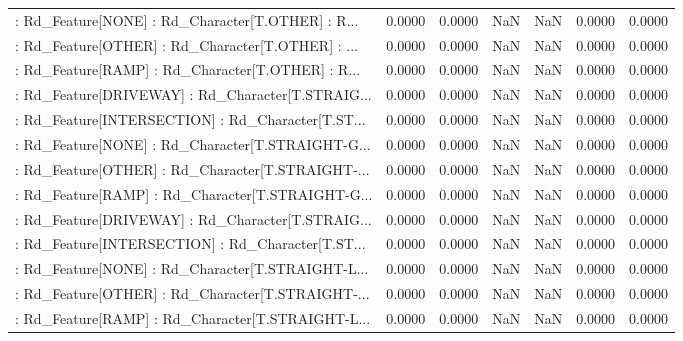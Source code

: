 \begin{longtable}{p{4cm}cccccc}
 : Rd\_Feature[NONE] : Rd\_Character[T.OTHER] : R... &            0.0000 &            0.0000 &     NaN &          NaN &             0.0000 &            0.0000 \\
 : Rd\_Feature[OTHER] : Rd\_Character[T.OTHER] : ... &            0.0000 &            0.0000 &     NaN &          NaN &             0.0000 &            0.0000 \\
 : Rd\_Feature[RAMP] : Rd\_Character[T.OTHER] : R... &            0.0000 &            0.0000 &     NaN &          NaN &             0.0000 &            0.0000 \\
 : Rd\_Feature[DRIVEWAY] : Rd\_Character[T.STRAIG... &            0.0000 &            0.0000 &     NaN &          NaN &             0.0000 &            0.0000 \\
 : Rd\_Feature[INTERSECTION] : Rd\_Character[T.ST... &            0.0000 &            0.0000 &     NaN &          NaN &             0.0000 &            0.0000 \\
 : Rd\_Feature[NONE] : Rd\_Character[T.STRAIGHT-G... &            0.0000 &            0.0000 &     NaN &          NaN &             0.0000 &            0.0000 \\
 : Rd\_Feature[OTHER] : Rd\_Character[T.STRAIGHT-... &            0.0000 &            0.0000 &     NaN &          NaN &             0.0000 &            0.0000 \\
 : Rd\_Feature[RAMP] : Rd\_Character[T.STRAIGHT-G... &            0.0000 &            0.0000 &     NaN &          NaN &             0.0000 &            0.0000 \\
 : Rd\_Feature[DRIVEWAY] : Rd\_Character[T.STRAIG... &            0.0000 &            0.0000 &     NaN &          NaN &             0.0000 &            0.0000 \\
 : Rd\_Feature[INTERSECTION] : Rd\_Character[T.ST... &            0.0000 &            0.0000 &     NaN &          NaN &             0.0000 &            0.0000 \\
 : Rd\_Feature[NONE] : Rd\_Character[T.STRAIGHT-L... &            0.0000 &            0.0000 &     NaN &          NaN &             0.0000 &            0.0000 \\
 : Rd\_Feature[OTHER] : Rd\_Character[T.STRAIGHT-... &            0.0000 &            0.0000 &     NaN &          NaN &             0.0000 &            0.0000 \\
 : Rd\_Feature[RAMP] : Rd\_Character[T.STRAIGHT-L... &            0.0000 &            0.0000 &     NaN &          NaN &             0.0000 &            0.0000 \\

\end{longtable}
